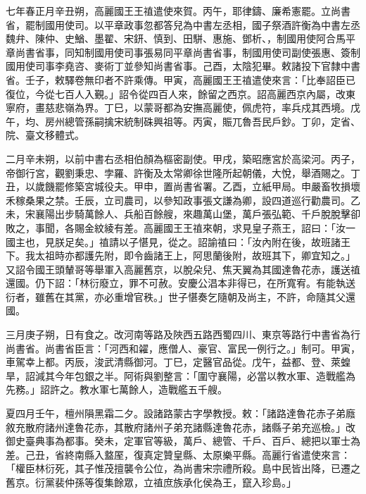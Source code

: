
\begin{pinyinscope}

 七年春正月辛丑朔，高麗國王王禃遣使來賀。丙午，耶律鑄、廉希憲罷。立尚書省，罷制國用使司。以平章政事忽都答兒為中書左丞相，國子祭酒許衡為中書左丞魏弁、陳仲、史鰌、墨翟、宋鈃、慎到、田駢、惠施、鄧析、，制國用使阿合馬平章尚書省事，同知制國用使司事張易同平章尚書省事，制國用使司副使張惠、簽制國用使司事李堯咨、麥術丁並參知尚書省事。己酉，太陰犯畢。敕諸投下官隸中書省。壬子，敕驛卷無印者不許乘傳。甲寅，高麗國王王禃遣使來言：「比奉詔臣已復位，今從七百人入覲。」詔令從四百人來，餘留之西京。詔高麗西京內屬，改東寧府，畫慈悲嶺為界。丁巳，以蒙哥都為安撫高麗使，佩虎符，率兵戍其西境。戊午，均、房州總管孫嗣擒宋統制硃興祖等。丙寅，賑兀魯吾民戶鈔。丁卯，定省、院、臺文移體式。



 二月辛未朔，以前中書右丞相伯顏為樞密副使。甲戌，築昭應宮於高梁河。丙子，帝御行宮，觀劉秉忠、孛羅、許衡及太常卿徐世隆所起朝儀，大悅，舉酒賜之。丁丑，以歲饑罷修築宮城役夫。甲申，置尚書省署。乙酉，立紙甲局。申嚴畜牧損壞禾稼桑果之禁。壬辰，立司農司，以參知政事張文謙為卿，設四道巡行勸農司。乙未，宋襄陽出步騎萬餘人、兵船百餘艘，來趣萬山堡，萬戶張弘範、千戶脫脫擊卻敗之，事聞，各賜金紋綾有差。高麗國王王禃來朝，求見皇子燕王，詔曰：「汝一國主也，見朕足矣。」禃請以子愖見，從之。詔諭禃曰：「汝內附在後，故班諸王下。我太祖時亦都護先附，即令齒諸王上，阿思蘭後附，故班其下，卿宜知之。」又詔令國王頭輦哥等舉軍入高麗舊京，以脫朵兒、焦天翼為其國達魯花赤，護送禃還國。仍下詔：「林衍廢立，罪不可赦。安慶公淐本非得已，在所寬宥。有能執送衍者，雖舊在其黨，亦必重增官秩。」世子愖奏乞隨朝及尚主，不許，命隨其父還國。



 三月庚子朔，日有食之。改河南等路及陜西五路西蜀四川、東京等路行中書省為行尚書省。尚書省臣言：「河西和糴，應僧人、豪官、富民一例行之。」制可。甲寅，車駕幸上都。丙辰，浚武清縣御河。丁巳，定醫官品從。戊午，益都、登、萊蝗旱，詔減其今年包銀之半。阿術與劉整言：「圍守襄陽，必當以教水軍、造戰艦為先務。」詔許之。教水軍七萬餘人，造戰艦五千艘。



 夏四月壬午，檀州隕黑霜二夕。設諸路蒙古字學教授。敕：「諸路達魯花赤子弟廕敘充散府諸州達魯花赤，其散府諸州子弟充諸縣達魯花赤，諸縣子弟充巡檢。」改御史臺典事為都事。癸未，定軍官等級，萬戶、總管、千戶、百戶、總把以軍士為差。己丑，省終南縣入盩厔，復真定贊皇縣、太原樂平縣。高麗行省遣使來言：「權臣林衍死，其子惟茂擅襲令公位，為尚書宋宗禮所殺。島中民皆出降，已遷之舊京。衍黨裴仲孫等復集餘眾，立禃庶族承化侯為王，竄入珍島。」




\end{pinyinscope}
